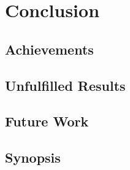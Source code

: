 \chapter{Conclusion}
\label{chap:conclusion}

\section{Achievements}
\label{sec:conclusion:achivements}

\section{Unfulfilled Results}
\label{sec:conclusion:unfulfilled}

\section{Future Work}
\label{sec:conclusion:future}

\section{Synopsis}
\label{sec:conclusion:synopsis}
